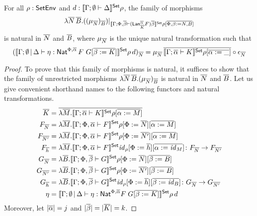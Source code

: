 \documentclass[acmsmall,review,anonymous]{acmart}
\theoremstyle{definition}
\renewcommand{\id}{\mathit{id}}
\begin{document}
\begin{lemma}
  For all $\rho : \mathsf{SetEnv}$ and $d : \llbracket{\Gamma; \emptyset \vdash \Delta}\rrbracket^{\mathsf{Set}} \rho$, 
  the family of morphisms 
  $$
  \lambda \overline{N} \, \overline{B}. 
  ((\mu_{\overline{N}})_{\overline{B}})|_{\llbracket{\Gamma; \Phi, \overline{\beta} 
                  \vdash (\mathsf{Lan}^{\overline{\alpha}}_{\overline{K}} F)\overline{\beta} }\rrbracket^{\mathsf{Set}} \rho[\overline{\Phi, \beta := N, B}]} 
  $$ 
  is natural in $\overline{N}$ and $\overline{B}$, where $\mu_{\overline{N}}$ is the unique natural transformation such that
  $$
  (\llbracket{\Gamma; \emptyset \,|\, \Delta \vdash \eta : \mathsf{Nat}^{\Phi, \overline{\alpha}} \, F \,\, G[\overline{\beta := K}]}\rrbracket^{\mathsf{Set}}\rho \, d)_{\overline{N}}
  = \mu_{\overline{N}} \, \overline{\llbracket{\Gamma; \overline{\alpha} \vdash K}\rrbracket^{\mathsf{Set}} \rho[\overline{\alpha := \_}]} \circ 
  \epsilon_{\overline{N}}
  $$

\end{lemma}
\begin{proof}
To prove that this family of morphisms is natural, it suffices to show that the family of unrestricted morphisms 
  $\lambda \overline{N} \, \overline{B}. (\mu_{\overline{N}})_{\overline{B}}$ is natural in $\overline{N}$ and $\overline{B}$.
Let us give convenient shorthand names to the following functors and natural transformations.
\begin{align*}
\ol{K} &= \ol{\lambda \ol M. \oCPOsem{\Gamma; \ol\alpha \vdash K}\rho[\ol{\alpha := M}]} \\
F_{\ol N} &= \lambda \ol M. \oCPOsem{\Gamma; \Phi, \ol\alpha \vdash F}\rho[\Phi := \ol N][\ol{\alpha := M}] \\
F_{\ol{N'}} &= \lambda \ol M. \oCPOsem{\Gamma; \Phi, \ol\alpha \vdash F}\rho[\Phi := \ol{N'}][\ol{\alpha := M}] \\
F_{\ol h} &= \lambda \ol M. \oCPOsem{\Gamma; \Phi, \ol\alpha \vdash F}\id_{\rho}[\Phi := \ol{h}][\ol{\alpha := \id_{M}}] \colon F_{\ol{N}} \to F_{\ol{N'}} \\
G_{\ol N} &= \lambda \ol B. \oCPOsem{\Gamma; \Phi, \ol\beta \vdash G}\rho[\Phi := \ol N][\ol{\beta := B}] \\
G_{\ol{N'}} &= \lambda \ol B. \oCPOsem{\Gamma; \Phi, \ol\beta \vdash G}\rho[\Phi := \ol{N'}][\ol{\beta := B}] \\
G_{\ol h} &= \lambda \ol B. \oCPOsem{\Gamma; \Phi, \ol\beta \vdash G}\id_{\rho}[\Phi := \ol{h}][\ol{\beta := \id_{B}}] \colon G_{\ol{N}} \to G_{\ol{N'}} \\
\eta &= \oCPOsem{\Gamma; \emptyset \,|\, \Delta \vdash \eta : \Nat^{\Phi, \ol\alpha} F\; G[\ol{\beta := K}]} \rho\, d
\end{align*}
Moreover, let $|\overline{\alpha}| = j$ and $|\overline{\beta}| = |\overline{K}| = k$.


\end{proof}
\end{document}
